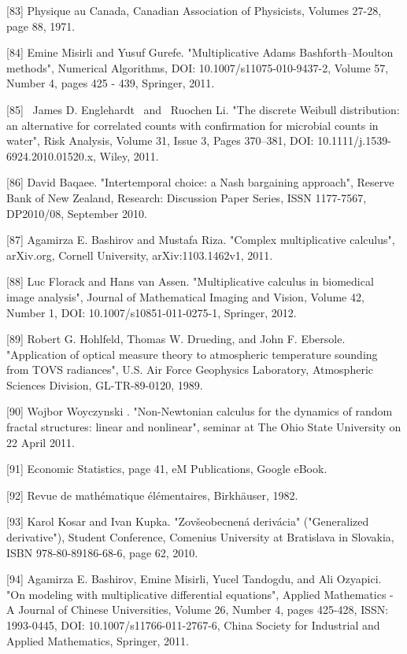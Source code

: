 \documentclass[12pt]{article}
\begin{document}
[83] Physique au Canada, Canadian Association of Physicists, Volumes 27-28, page 88, 1971.

[84] Emine Misirli and Yusuf Gurefe. "Multiplicative Adams Bashforth–Moulton methods", Numerical Algorithms, DOI: 10.1007/s11075-010-9437-2, Volume 57, Number 4, pages 425 - 439, Springer, 2011.

[85]  James D. Englehardt  and  Ruochen Li. "The discrete Weibull distribution: an alternative for correlated counts with confirmation for microbial counts in water", Risk Analysis, Volume 31, Issue 3, Pages 370–381, DOI: 10.1111/j.1539-6924.2010.01520.x, Wiley, 2011.

[86] David Baqaee. "Intertemporal choice: a Nash bargaining approach", Reserve Bank of New Zealand, Research: Discussion Paper Series, ISSN 1177-7567,  DP2010/08, September 2010.

[87] Agamirza E. Bashirov and Mustafa Riza. "Complex multiplicative calculus", arXiv.org, Cornell University, arXiv:1103.1462v1, 2011.

[88] Luc Florack and Hans van Assen. "Multiplicative calculus in biomedical image analysis", Journal of Mathematical Imaging and Vision, Volume 42, Number 1, DOI: 10.1007/s10851-011-0275-1, Springer, 2012.

[89] Robert G. Hohlfeld, Thomas W. Drueding, and John F. Ebersole. "Application of optical measure theory to atmospheric temperature sounding from TOVS radiances", U.S. Air Force Geophysics Laboratory, Atmospheric Sciences Division, GL-TR-89-0120, 1989.

[90] Wojbor Woyczynski . "Non-Newtonian calculus for the dynamics of random fractal structures: linear and nonlinear", seminar at The Ohio State University on 22 April 2011.

[91] Economic Statistics, page 41, eM Publications, Google eBook.

[92] Revue de mathématique élémentaires, Birkhäuser, 1982.

[93] Karol Kosar and Ivan Kupka. "Zovšeobecnená derivácia" ("Generalized derivative"), Student Conference, Comenius University at Bratislava in Slovakia, ISBN 978-80-89186-68-6, page 62, 2010.

[94] Agamirza E. Bashirov, Emine Misirli, Yucel Tandogdu, and Ali Ozyapici. "On modeling with multiplicative differential equations", Applied Mathematics - A Journal of Chinese Universities, Volume 26, Number 4, pages 425-428, ISSN: 1993-0445, DOI: 10.1007/s11766-011-2767-6, China Society for Industrial and Applied Mathematics, Springer, 2011.
\end{document}
